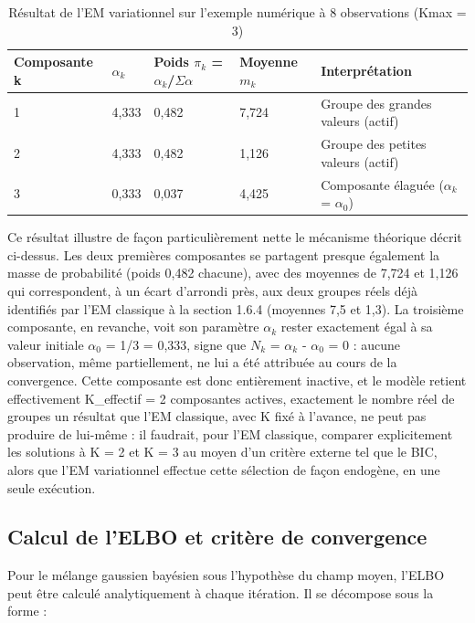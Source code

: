 \begin{table}[H]
\centering
\small
\setlength{\tabcolsep}{0.14cm}
\begin{tabular}{|p{2.77cm}|p{2.77cm}|p{2.77cm}|p{2.77cm}|p{2.77cm}|}
\hline
\textbf{Composante k} & \textbf{$\alpha _{k}$} & \textbf{Poids $\pi _{k}$ = $\alpha _{k}$/$\Sigma \alpha $} & \textbf{Moyenne $m_{k}$} & \textbf{Interprétation} \\
\hline
1 & 4,333 & 0,482 & 7,724 & Groupe des grandes valeurs (actif) \\
\hline
2 & 4,333 & 0,482 & 1,126 & Groupe des petites valeurs (actif) \\
\hline
3 & 0,333 & 0,037 & 4,425 & Composante élaguée ($\alpha _{k}$ = $\alpha _{0}$) \\
\hline
\end{tabular}
\caption{Résultat de l'EM variationnel sur l'exemple numérique à 8 observations (Kmax = 3)}
\label{tab:1_5}
\end{table}
Ce résultat illustre de façon particulièrement nette le mécanisme théorique décrit ci-dessus. Les deux premières composantes se partagent presque également la masse de probabilité (poids 0,482 chacune), avec des moyennes de 7,724 et 1,126 qui correspondent, à un écart d'arrondi près, aux deux groupes réels déjà identifiés par l'EM classique à la section 1.6.4 (moyennes 7,5 et 1,3). La troisième composante, en revanche, voit son paramètre $\alpha _{k}$ rester exactement égal à sa valeur initiale $\alpha _{0}$ = 1/3 = 0,333, signe que $N_{k}$ = $\alpha _{k}$ - $\alpha _{0}$ = 0 : aucune observation, même partiellement, ne lui a été attribuée au cours de la convergence. Cette composante est donc entièrement inactive, et le modèle retient effectivement K\_effectif = 2 composantes actives, exactement le nombre réel de groupes  un résultat que l'EM classique, avec K fixé à l'avance, ne peut pas produire de lui-même : il faudrait, pour l'EM classique, comparer explicitement les solutions à K = 2 et K = 3 au moyen d'un critère externe tel que le BIC, alors que l'EM variationnel effectue cette sélection de façon endogène, en une seule exécution.

\subsection{Calcul de l'ELBO et critère de convergence}
Pour le mélange gaussien bayésien sous l'hypothèse du champ moyen, l'ELBO peut être calculé analytiquement à chaque itération. Il se décompose sous la forme :

